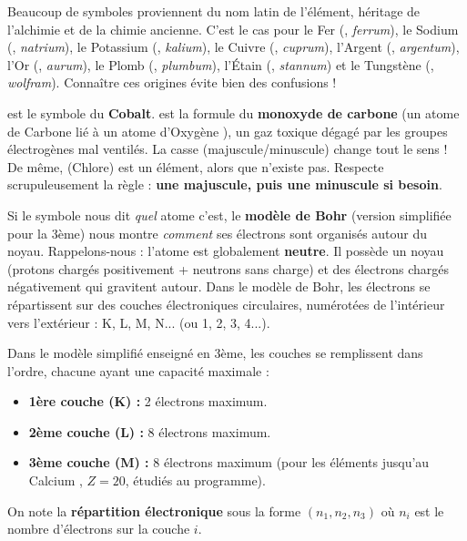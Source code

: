 \documentclass[11pt]{article}
\newcommand{\cle}[1]{{\popxbold\color{popdark}#1}}
\newcounter{popsec}
\newcounter{popsub}
\newcommand{\courssub}[1]{%
  \stepcounter{popsub}%
  \par\vspace{9pt}\noindent{\popxbold\fontsize{11.5}{13}\selectfont\color{popink}{\color{poporange}\thepopsec.\thepopsub}\hspace{6pt}#1}\par\nopagebreak\vspace{4pt}
}
\begin{document}
\begin{savaistu}
Beaucoup de symboles proviennent du nom latin de l'élément, héritage de l'alchimie et de la chimie ancienne. C'est le cas pour le Fer (, \emph{ferrum}), le Sodium (, \emph{natrium}), le Potassium (, \emph{kalium}), le Cuivre (, \emph{cuprum}), l'Argent (, \emph{argentum}), l'Or (, \emph{aurum}), le Plomb (, \emph{plumbum}), l'Étain (, \emph{stannum}) et le Tungstène (, \emph{wolfram}). Connaître ces origines évite bien des confusions !
\end{savaistu}

\begin{attention}
 est le symbole du \textbf{Cobalt}.  est la formule du \textbf{monoxyde de carbone} (un atome de Carbone  lié à un atome d'Oxygène ), un gaz toxique dégagé par les groupes électrogènes mal ventilés. La casse (majuscule/minuscule) change tout le sens ! De même,  (Chlore) est un élément, alors que  n'existe pas. Respecte scrupuleusement la règle : \textbf{une majuscule, puis une minuscule si besoin}.
\end{attention}

\courssub{Le modèle de Bohr : visualiser l'atome}

Si le symbole nous dit \emph{quel} atome c'est, le \textbf{modèle de Bohr} (version simplifiée pour la 3ème) nous montre \emph{comment} ses électrons sont organisés autour du noyau. Rappelons-nous : l'atome est globalement \textbf{neutre}. Il possède un noyau (protons chargés positivement + neutrons sans charge) et des électrons chargés négativement qui gravitent autour. Dans le modèle de Bohr, les électrons se répartissent sur des \cle{couches électroniques} circulaires, numérotées de l'intérieur vers l'extérieur : K, L, M, N... (ou 1, 2, 3, 4...).

\begin{propriete}
Dans le modèle simplifié enseigné en 3ème, les couches se remplissent dans l'ordre, chacune ayant une capacité maximale :
\begin{itemize}
    \item \textbf{1ère couche (K) :} 2 électrons maximum.
    \item \textbf{2ème couche (L) :} 8 électrons maximum.
    \item \textbf{3ème couche (M) :} 8 électrons maximum (pour les éléments jusqu'au Calcium , $Z = 20$, étudiés au programme).
\end{itemize}
On note la \textbf{répartition électronique} sous la forme $(n_1, n_2, n_3)$ où $n_i$ est le nombre d'électrons sur la couche $i$.
\end{propriete}
\end{document}

